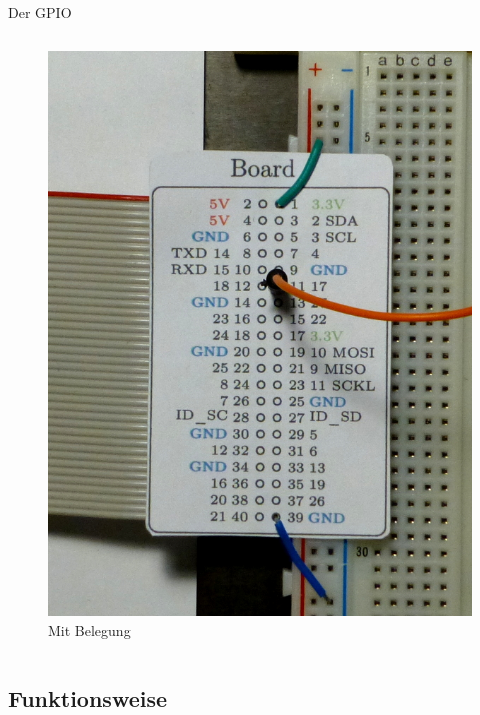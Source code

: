\documentclass[usenames,dvipsnames]{beamer}
\begin{document}
\begin{frame}{Der GPIO}
\begin{minipage}[t][6.1 cm]{\textwidth}
{\begin{columns}[t]
\begin{figure}[t]
						\includegraphics[scale=0.4]{img/steckbrett_zettel.jpg}
						\caption{Mit Belegung}
					\end{figure}
			\end{columns}
		}
	\end{minipage}
\end{frame}


\subsection{Funktionsweise}

\end{document}
